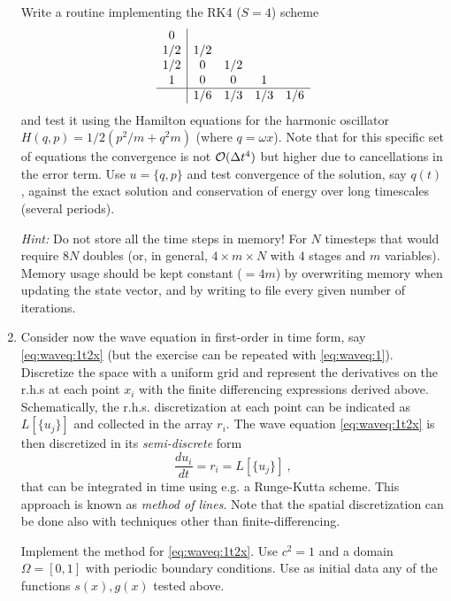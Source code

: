 \begin{enumerate}
  Write a routine implementing the RK4 ($S=4$) scheme 
  \begin{equation} 
    \begin{array}
      {c|cccc}
      0   &  &  & & \\
      1/2 & 1/2 &  & & \\
      1/2 & 0 & 1/2 &  & \\
      1   & 0 & 0 &  1 & \\
      \hline
      & 1/6 & 1/3 & 1/3 & 1/6
    \end{array} 
  \end{equation}
  and test it using the Hamilton equations for the harmonic oscillator
  $H(q,p)=1/2(p^2/m+q^2m)$ (where $q = \omega x$). Note that for this specific set of equations
  the convergence is not ${\cal O}(\Delta t^4)$ but higher due to cancellations
  in the error term.
  Use $u=\{q,p\}$ and test convergence of the solution,
  say $q(t)$, against the exact solution and conservation of energy
  over long timescales (several periods).

  {\it Hint:} Do not store all the time steps in memory! For $N$
  timesteps that would require $8N$ doubles (or, in general,
  $4\times m\times N$ with $4$ stages and $m$ variables). Memory usage should be kept constant
  ($=4m$) by overwriting memory when updating the state vector, and by writing to file every given number of iterations. 
\item Consider now the wave equation in first-order in time form, say
  \ref{eq:waveq:1t2x} (but the exercise can be repeated with
  \ref{eq:waveq:1}). Discretize the space with a uniform grid and
  represent the derivatives on the r.h.s at each point $x_i$ with the finite differencing
  expressions derived above. Schematically, the r.h.s. discretization
  at each point can be indicated as $L[\{u_j\}]$ and collected in the
  array $r_i$. The wave equation \ref{eq:waveq:1t2x} is then discretized in
  its {\it semi-discrete} form 
  \begin{equation}
    \frac{du_i}{dt} = r_i = L[\{u_j\}]\ ,
  \end{equation}
  that can be integrated in time using e.g. a Runge-Kutta scheme.
  This approach is known as {\it method of lines}. Note that the spatial
  discretization can be done also with techniques other than
  finite-differencing.

  Implement the method for \ref{eq:waveq:1t2x}. Use $c^2=1$ and
  a domain $\Omega=[0,1]$ with periodic boundary conditions. Use as
  initial data any of the functions $s(x),g(x)$ tested above.


\end{enumerate}
